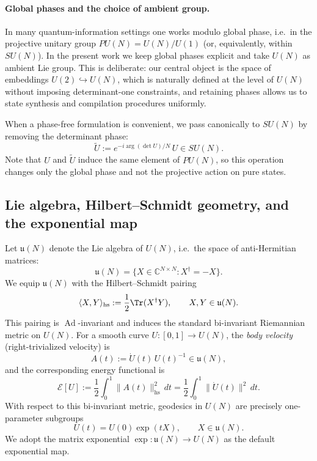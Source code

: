 \documentclass{article}%
\theoremstyle{definition}
\numberwithin{equation}{section}
\DeclareMathOperator{\Ad}{Ad}
\begin{document}
\paragraph{Global phases and the choice of ambient group.}
In many quantum-information settings one works modulo global phase, i.e.\ in the projective unitary
group $PU(N)=U(N)/U(1)$ (or, equivalently, within $SU(N)$). In the present work we keep global phases
explicit and take $U(N)$ as ambient Lie group. This is deliberate: our central object is the space
of embeddings $U(2)\hookrightarrow U(N)$, which is naturally defined at the level of $U(N)$ without
imposing determinant-one constraints, and retaining phases allows us to state synthesis and
compilation procedures uniformly.

When a phase-free formulation is convenient, we pass canonically to $SU(N)$ by removing the
determinant phase:
\begin{equation}\label{eq:UtoSU}
\widetilde{U} := e^{-i\arg(\det U)/N}\,U \in SU(N).
\end{equation}
Note that $U$ and $\widetilde{U}$ induce the same element of $PU(N)$, so this operation changes only
the global phase and not the projective action on pure states.


\subsection{Lie algebra, Hilbert--Schmidt geometry, and the exponential map}
\label{subsec:lie_algebra_hs}
Let $\mathfrak{u}(N)$ denote the Lie algebra of $U(N)$, i.e.\ the space of anti-Hermitian matrices:
\[
\mathfrak{u}(N)=\{X\in\mathbb{C}^{N\times N}: X^\dagger=-X\}.
\]
We equip $\mathfrak{u}(N)$ with the Hilbert--Schmidt pairing
\begin{equation}\label{eq:HS_pairing}
\langle X,Y\rangle_{\mathrm{hs}} := \frac12 \Tr(X^\dagger Y),\qquad X,Y\in\mathfrak{u}(N).
\end{equation}
This pairing is $\Ad$-invariant and induces the standard bi-invariant Riemannian metric on $U(N)$.
For a smooth curve $U:[0,1]\to U(N)$, the \emph{body velocity} (right-trivialized velocity) is
\begin{equation}\label{eq:body_velocity}
A(t):=\dot U(t)\,U(t)^{-1}\in\mathfrak{u}(N),
\end{equation}
and the corresponding energy functional is
\begin{equation}\label{eq:energy_hs}
\mathcal{E}[U]:=\frac12\int_0^1 \|A(t)\|_{\mathrm{hs}}^2\,dt
=\frac12\int_0^1 \|\dot U(t)\|^2\,dt.
\end{equation}
With respect to this bi-invariant metric, geodesics in $U(N)$ are precisely one-parameter subgroups
\begin{equation}\label{eq:geodesics_one_parameter}
U(t)=U(0)\exp(tX),\qquad X\in\mathfrak{u}(N).
\end{equation}
We adopt the matrix exponential $\exp:\mathfrak{u}(N)\to U(N)$ as the default exponential map.
\end{document}
